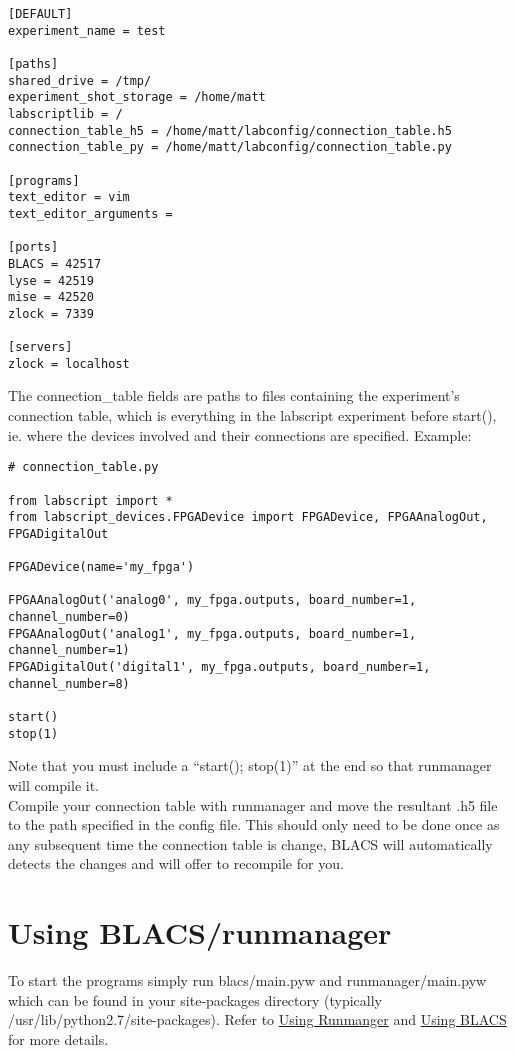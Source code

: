 \documentclass[11pt,a4paper]{article}
\begin{document}
\begin{verbatim}
[DEFAULT]
experiment_name = test

[paths]
shared_drive = /tmp/
experiment_shot_storage = /home/matt
labscriptlib = /
connection_table_h5 = /home/matt/labconfig/connection_table.h5
connection_table_py = /home/matt/labconfig/connection_table.py

[programs]
text_editor = vim
text_editor_arguments =

[ports]
BLACS = 42517
lyse = 42519
mise = 42520
zlock = 7339

[servers]
zlock = localhost
\end{verbatim}

The connection\_table fields are paths to files containing the
experiment's connection table, which is everything in the labscript
experiment before start(), ie. where the devices involved and their
connections are specified. Example:

\begin{verbatim}
# connection_table.py

from labscript import *
from labscript_devices.FPGADevice import FPGADevice, FPGAAnalogOut, FPGADigitalOut

FPGADevice(name='my_fpga')

FPGAAnalogOut('analog0', my_fpga.outputs, board_number=1, channel_number=0)
FPGAAnalogOut('analog1', my_fpga.outputs, board_number=1, channel_number=1)
FPGADigitalOut('digital1', my_fpga.outputs, board_number=1, channel_number=8)

start()
stop(1)
\end{verbatim}

Note that you must include a ``start(); stop(1)'' at the end so that runmanager will compile it. \\

Compile your connection table with runmanager and move the resultant .h5 file to the path specified in the config file. This should only need to be done once
as any subsequent time the connection table is change, BLACS will automatically detects the changes and will offer to recompile for you.

\section{Using BLACS/runmanager}
To start the programs simply run blacs/main.pyw and runmanager/main.pyw which can be found in your site-packages directory (typically /usr/lib/python2.7/site-packages). Refer to \href{http://labscriptsuite.org/docs/using_runmanager.pdf}{Using Runmanger} and \href{http://labscriptsuite.org/docs/Using_BLACS.pdf}{Using BLACS} for more details.
\end{document}
